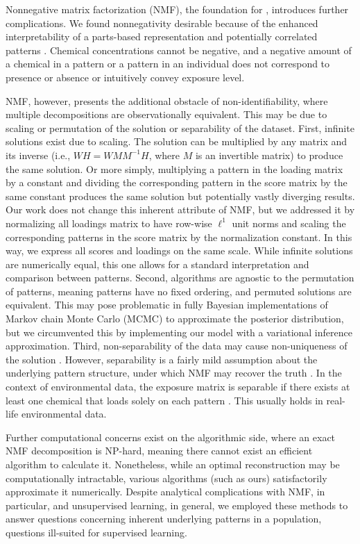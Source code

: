 Nonnegative matrix factorization (NMF), the foundation for \bnmfc, introduces further complications. We found nonnegativity desirable because of the enhanced interpretability of a parts-based representation and potentially correlated patterns \citep{lee1999learning}. Chemical concentrations cannot be negative, and a negative amount of a chemical in a pattern or a pattern in an individual does not correspond to presence or absence or intuitively convey exposure level. 

NMF, however, presents the additional obstacle of non-identifiability, where multiple decompositions are observationally equivalent. This may be due to scaling or permutation of the solution or separability of the dataset. First, infinite solutions exist due to scaling. The solution can be multiplied by any matrix and its inverse (i.e., $W H=W M M^{-1}H$, where $M$ is an invertible matrix) to produce the same solution. Or more simply, multiplying a pattern in the loading matrix by a constant and dividing the corresponding pattern in the score matrix by the same constant produces the same solution but potentially vastly diverging results. Our work does not change this inherent attribute of NMF, but we addressed it by normalizing all loadings matrix to have row-wise $\ell^1$ unit norms and scaling the corresponding patterns in the score matrix by the normalization constant. In this way, we express all scores and loadings on the same scale. While infinite solutions are numerically equal, this one allows for a standard interpretation and comparison between patterns. Second, algorithms are agnostic to the permutation of patterns, meaning patterns have no fixed ordering, and permuted solutions are equivalent. This may pose problematic in fully Bayesian implementations of Markov chain Monte Carlo (MCMC) to approximate the posterior distribution, but we circumvented this by implementing our model with a variational inference approximation. Third, non-separability of the data may cause non-uniqueness of the solution \citep{laurberg2008theorems}. However, separability is a fairly mild assumption about the underlying pattern structure, under which NMF may recover the truth \citep{donoho2004does}. In the context of environmental data, the exposure matrix is separable if there exists at least one chemical that loads solely on each pattern \citep{arora2012learning}. This usually holds in real-life environmental data.

Further computational concerns exist on the algorithmic side, where an exact NMF decomposition is NP-hard, meaning there cannot exist an efficient algorithm to calculate it. Nonetheless, while an optimal reconstruction may be computationally intractable, various algorithms (such as ours) satisfactorily approximate it numerically. Despite analytical complications with NMF, in particular, and unsupervised learning, in general, we employed these methods to answer questions concerning inherent underlying patterns in a population, questions ill-suited for supervised learning. 

